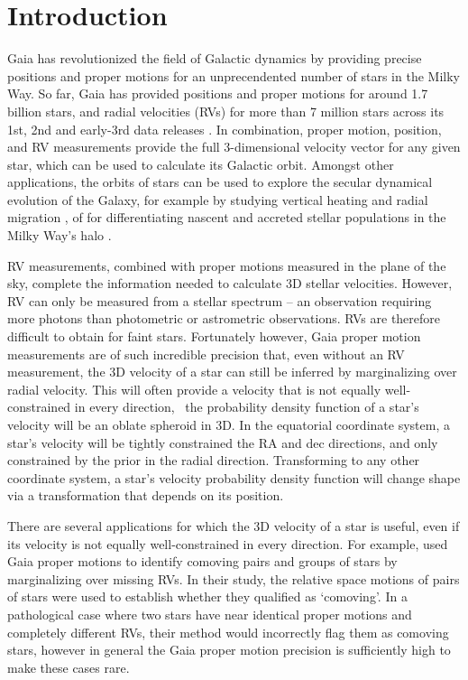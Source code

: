 \section{Introduction}

Gaia has revolutionized the field of Galactic dynamics by providing precise
positions and proper motions for an unprecendented number of stars in the
Milky Way.
So far, Gaia has provided positions and proper motions for around 1.7 billion
stars, and radial velocities (RVs) for more than 7 million stars across its
1st, 2nd and early-3rd data releases \citep{gaia, gaia_dr2}.
In combination, proper motion, position, and RV measurements provide the full
3-dimensional velocity vector for any given star, which can be used to
calculate its Galactic orbit.
Amongst other applications, the orbits of stars can be used to explore the
secular dynamical evolution of the Galaxy, for example by studying vertical
heating and radial migration \citep{citations}, of for differentiating
nascent and accreted stellar populations in the Milky Way's halo
\citep{citation}.

RV measurements, combined with proper motions measured in the plane of the
sky, complete the information needed to calculate 3D stellar velocities.
However, RV can only be measured from a stellar spectrum -- an observation
requiring more photons than photometric or astrometric observations.
RVs are therefore difficult to obtain for faint stars.
Fortunately however, Gaia proper motion measurements are of such incredible
precision that, even without an RV measurement, the 3D velocity of a star can
still be inferred by marginalizing over radial velocity.
This will often provide a velocity that is not equally well-constrained in
every direction, \ie\ the probability density function of a star's velocity
will be an oblate spheroid in 3D.
In the equatorial coordinate system, a star's velocity will be tightly
constrained the RA and dec directions, and only constrained by the prior in
the radial direction.
Transforming to any other coordinate system, a star's velocity probability
density function will change shape via a transformation that depends on its
position.

There are several applications for which the 3D velocity of a star is useful,
even if its velocity is not equally well-constrained in every direction.
For example, \citet{oh2017} used Gaia proper motions to identify comoving
pairs and groups of stars by marginalizing over missing RVs.
In their study, the relative space motions of pairs of stars were used to
establish whether they qualified as `comoving'.
In a pathological case where two stars have near identical proper motions and
completely different RVs, their method would incorrectly flag them as comoving
stars, however in general the Gaia proper motion precision is sufficiently
high to make these cases rare.

